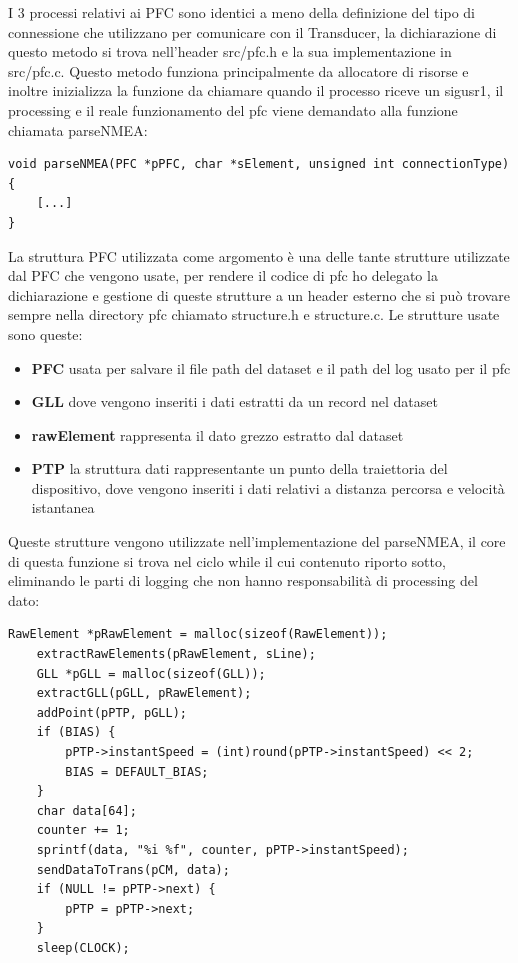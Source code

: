 \documentclass{article}
\begin{document}
\begin{flushleft}
I 3 processi relativi ai PFC sono identici a meno della definizione del tipo di connessione che utilizzano per comunicare con il Transducer, la dichiarazione di questo metodo si trova nell'header src/pfc.h e la sua implementazione in src/pfc.c. Questo metodo funziona principalmente da allocatore di risorse e inoltre inizializza la funzione da chiamare quando il processo riceve un sigusr1, il processing e il reale funzionamento del pfc viene demandato alla funzione chiamata parseNMEA:

\begin{lstlisting}[frame=single]
void parseNMEA(PFC *pPFC, char *sElement, unsigned int connectionType) {
    [...]
}
\end{lstlisting}

La struttura PFC utilizzata come argomento è una delle tante strutture utilizzate dal PFC che vengono usate, per rendere il codice di pfc ho delegato la dichiarazione e gestione di queste strutture a un header esterno che si può trovare sempre nella directory pfc chiamato structure.h e structure.c. Le strutture usate sono queste:

\begin{itemize}
    \item \textbf{PFC} usata per salvare il file path del dataset e il path del log usato per il pfc
    \item \textbf{GLL} dove vengono inseriti i dati estratti da un record nel dataset
    \item \textbf{rawElement} rappresenta il dato grezzo estratto dal dataset
    \item \textbf{PTP} la struttura dati rappresentante un punto della traiettoria del dispositivo, dove vengono inseriti i dati relativi a distanza percorsa e velocità istantanea
\end{itemize}

Queste strutture vengono utilizzate nell'implementazione del parseNMEA, il core di questa funzione si trova nel ciclo while il cui contenuto riporto sotto, eliminando le parti di logging che non hanno responsabilità di processing del dato:

\begin{lstlisting}[frame=single]
    RawElement *pRawElement = malloc(sizeof(RawElement));
    extractRawElements(pRawElement, sLine);
    GLL *pGLL = malloc(sizeof(GLL));
    extractGLL(pGLL, pRawElement);
    addPoint(pPTP, pGLL);
    if (BIAS) {
        pPTP->instantSpeed = (int)round(pPTP->instantSpeed) << 2;
        BIAS = DEFAULT_BIAS;
    }
    char data[64];
    counter += 1;
    sprintf(data, "%i %f", counter, pPTP->instantSpeed);
    sendDataToTrans(pCM, data);
    if (NULL != pPTP->next) {
        pPTP = pPTP->next;
    }
    sleep(CLOCK);
\end{lstlisting}


\end{flushleft}
\end{document}
